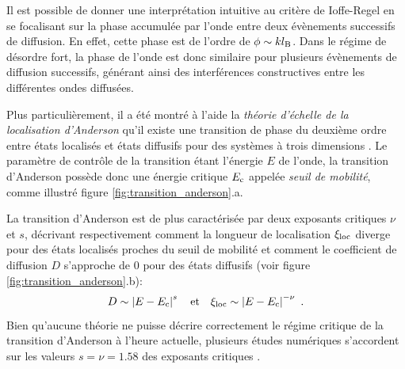 Il est possible de donner une interprétation intuitive au critère de Ioffe-Regel en se focalisant sur la phase accumulée par l'onde entre deux évènements successifs de diffusion. En effet, cette phase est de l'ordre de $\phi\sim kl_{\mathrm{B}}$. Dans le régime de désordre fort, la phase de l'onde est donc similaire pour plusieurs évènements de diffusion successifs, générant ainsi des interférences constructives entre les différentes ondes diffusées. 

Plus particulièrement, il a été montré à l'aide la \emph{théorie d'échelle de la localisation d'Anderson} qu'il existe une transition de phase du deuxième ordre entre états localisés et états diffusifs pour des systèmes à trois dimensions \citep{abrahams1979scaling}. Le paramètre de contrôle de la transition étant l'énergie $E$ de l'onde, la transition d'Anderson possède donc une énergie critique $E_{\mathrm{c}}$ appelée \emph{seuil de mobilité}, comme illustré figure \ref{fig:transition_anderson}.a. 

La transition d'Anderson est de plus caractérisée par deux exposants critiques $\nu$ et $s$, décrivant respectivement comment la longueur de localisation $\xi_{\mathrm{loc}}$ diverge pour des états localisés proches du seuil de mobilité et comment le coefficient de diffusion $D$ s'approche de $0$ pour des états diffusifs (voir figure \ref{fig:transition_anderson}.b):
\begin{equation}
D \sim \left| E-E_{\mathrm{c}} \right|^s \quad \text{et} \quad \xi_{\mathrm{loc}} \sim \left| E-E_{\mathrm{c}} \right|^{-\nu} \text{ .}
\end{equation}
Bien qu'aucune théorie ne puisse décrire correctement le régime critique de la transition d'Anderson à l'heure actuelle, plusieurs études numériques s'accordent sur les valeurs $s=\nu=1.58$ des exposants critiques \citep{slevin1999corrections} \citep{evers2008anderson} \citep{slevin2014critical}.


